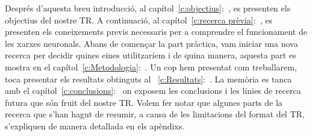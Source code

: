 Després d'aquesta breu introducció, al capítol~\ref{c:objectius}:~, es presenten els objectius del nostre TR. A continuació, al capítol~\ref{c:recerca prèvia}:~, es presenten els coneixements previs necessaris per a comprendre el funcionament de les xarxes neuronals.
Abans de començar la part pràctica, vam iniciar una nova recerca per decidir quines eines utilitzaríem i de quina manera, aquesta part es mostra en el capítol~\ref{c:Metodologia}:~.
Un cop hem presentat com treballarem, toca presentar els resultats obtinguts al ~\ref{c:Resultats}:~.
La memòria es tanca amb el capítol~\ref{c:conclusions}:~ on exposem les conclusions i les línies de recerca futura que són fruit del nostre TR.
Volem fer notar que algunes parts de la recerca que s'han hagut de resumir, a causa de les limitacions del format del TR, s'expliquen de manera detallada en els apèndixs.

